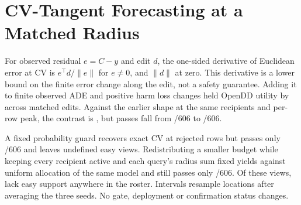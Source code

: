 \section{CV-Tangent Forecasting at a Matched Radius}
For observed residual $e=C-y$ and edit $d$, the one-sided
derivative of Euclidean error at CV is $e^\top d/\|e\|$ for
$e\ne0$, and $\|d\|$ at zero. This derivative is a lower
bound on the finite error change along the edit, not a safety
guarantee. Adding it to finite observed ADE and positive harm
loss changes held OpenDD utility by \TangentLoss{} across
\TangentEdits{} matched edits. Against the earlier shape at
the same recipients and per-row peak, the contrast is
\TangentOld{}, but passes fall from \TangentPrevious/606
to \TangentTangent/606.

A fixed probability guard recovers exact CV at rejected rows
but passes only \TangentGuard/606 and leaves \TangentGuardUndefined{}
undefined easy views. Redistributing a smaller budget while
keeping every recipient active and each query's radius sum fixed
yields \TangentRedistribute{} against uniform allocation of the
same model and still passes only \TangentAdaptive/606.
Of these views, \TangentUndefined{} lack easy support anywhere
in the roster. Intervals resample locations after averaging the
three seeds. No gate, deployment or confirmation status changes.
